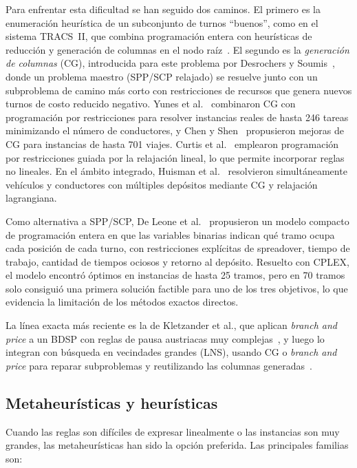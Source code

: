 \documentclass[letter, 10pt]{article}
\begin{document}
Para enfrentar esta dificultad se han seguido dos caminos. El primero es la enumeración heurística de un subconjunto de turnos ``buenos'', como en el sistema TRACS~II, que combina programación entera con heurísticas de reducción y generación de columnas en el nodo raíz~\cite{Fores2002}. El segundo es la \emph{generación de columnas} (CG), introducida para este problema por Desrochers y Soumis~\cite{DesrochersSoumis1989}, donde un problema maestro (SPP/SCP relajado) se resuelve junto con un subproblema de camino más corto con restricciones de recursos que genera nuevos turnos de costo reducido negativo. Yunes et al.~\cite{Yunes2005} combinaron CG con programación por restricciones para resolver instancias reales de hasta 246 tareas minimizando el número de conductores, y Chen y Shen~\cite{ChenShen2013} propusieron mejoras de CG para instancias de hasta 701 viajes. Curtis et al.~\cite{Curtis1999} emplearon programación por restricciones guiada por la relajación lineal, lo que permite incorporar reglas no lineales. En el ámbito integrado, Huisman et al.~\cite{Huisman2005} resolvieron simultáneamente vehículos y conductores con múltiples depósitos mediante CG y relajación lagrangiana.

Como alternativa a SPP/SCP, De Leone et al.~\cite{DeLeone2011a} propusieron un modelo compacto de programación entera en que las variables binarias indican qué tramo ocupa cada posición de cada turno, con restricciones explícitas de spreadover, tiempo de trabajo, cantidad de tiempos ociosos y retorno al depósito. Resuelto con CPLEX, el modelo encontró óptimos en instancias de hasta 25 tramos, pero en 70 tramos solo consiguió una primera solución factible para uno de los tres objetivos, lo que evidencia la limitación de los métodos exactos directos.

La línea exacta más reciente es la de Kletzander et al., que aplican \emph{branch and price} a un BDSP con reglas de pausa austriacas muy complejas~\cite{Kletzander2021}, y luego lo integran con búsqueda en vecindades grandes (LNS), usando CG o \emph{branch and price} para reparar subproblemas y reutilizando las columnas generadas~\cite{Kletzander2026}.

\subsection{Metaheurísticas y heurísticas}
Cuando las reglas son difíciles de expresar linealmente o las instancias son muy grandes, las metaheurísticas han sido la opción preferida. Las principales familias son:
\end{document}
